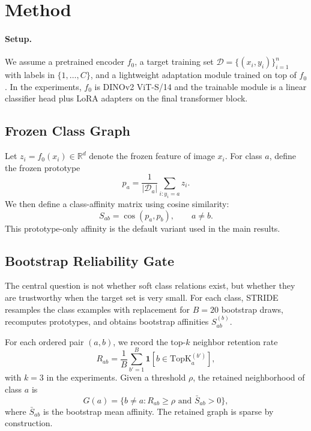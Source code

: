 \documentclass{article}
\newcommand{\method}{STRIDE\xspace}
\begin{document}
\section{Method}
\label{sec:method}

\paragraph{Setup.}
We assume a pretrained encoder $f_0$, a target training set $\mathcal{D}=\{(x_i,y_i)\}_{i=1}^n$ with labels in $\{1,\dots,C\}$, and a lightweight adaptation module trained on top of $f_0$. In the experiments, $f_0$ is DINOv2 ViT-S/14 and the trainable module is a linear classifier head plus LoRA adapters on the final transformer block.

\subsection{Frozen Class Graph}

Let $z_i=f_0(x_i)\in\mathbb{R}^d$ denote the frozen feature of image $x_i$. For class $a$, define the frozen prototype
\begin{equation}
 p_a=\frac{1}{|\mathcal{D}_a|}\sum_{i:y_i=a} z_i.
\end{equation}
We then define a class-affinity matrix using cosine similarity:
\begin{equation}
 S_{ab}=\cos(p_a,p_b), \qquad a\neq b.
\end{equation}
This prototype-only affinity is the default variant used in the main results.

\subsection{Bootstrap Reliability Gate}

The central question is not whether soft class relations exist, but whether they are trustworthy when the target set is very small. For each class, \method resamples the class examples with replacement for $B=20$ bootstrap draws, recomputes prototypes, and obtains bootstrap affinities $S_{ab}^{(b)}$.

For each ordered pair $(a,b)$, we record the top-$k$ neighbor retention rate
\begin{equation}
 R_{ab}=\frac{1}{B}\sum_{b'=1}^{B}\mathbf{1}\!\left[b\in \mathrm{TopK}_a^{(b')}\right],
\end{equation}
with $k=3$ in the experiments. Given a threshold $\rho$, the retained neighborhood of class $a$ is
\begin{equation}
 G(a)=\{b\neq a: R_{ab}\ge \rho \text{ and } \bar{S}_{ab}>0\},
\end{equation}
where $\bar{S}_{ab}$ is the bootstrap mean affinity. The retained graph is sparse by construction.
\end{document}
